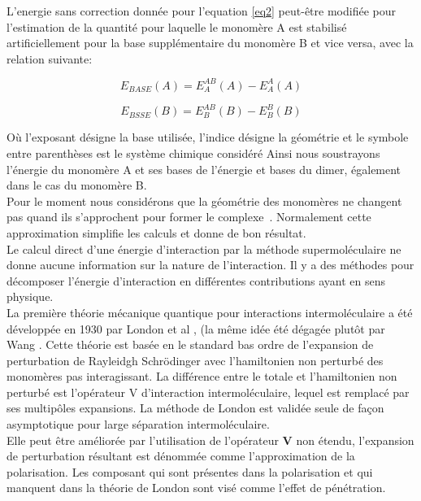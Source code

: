 L'energie sans correction donnée pour l'equation \ref{eq2}  peut-être modifiée pour l'estimation de la quantité pour laquelle le monomère A est stabilisé artificiellement pour la base supplémentaire du monomère B et vice versa, avec la relation suivante:

\begin{equation}
E_{BASE}(A) = E_{A}^{AB}(A) - E_{A}^{A}(A)
\end{equation}

\begin{equation}
E_{BSSE}(B) = E_{B}^{AB}(B) - E_{B}^{B}(B)
\end{equation}

Où l'exposant désigne la base utilisée, l'indice désigne la géométrie et le symbole entre parenthèses est le système chimique considéré Ainsi nous soustrayons l'énergie du monomère A et ses bases de l'énergie et bases du dimer, également dans le cas du monomère B.\\

Pour le moment nous considérons que la géométrie des monomères ne changent pas quand ils s'approchent pour former le complexe . Normalement cette approximation simplifie les calculs et donne de bon résultat.\\

Le calcul direct d’une énergie d’interaction par la méthode supermoléculaire ne donne aucune information sur la nature de l’interaction. Il y a des méthodes pour décomposer l’énergie d’interaction en différentes contributions ayant en sens physique.\\

La première théorie mécanique quantique pour interactions intermoléculaire a été développée en 1930 par London et al \cite{london1930z}, (la même idée été dégagée plutôt par Wang \cite{wang1927mutual}. Cette théorie est basée en le standard bas ordre de l’expansion  de perturbation de Rayleidgh Schrödinger avec l’hamiltonien non perturbé des monomères pas interagissant. La différence entre le totale et l’hamiltonien non perturbé est l’opérateur V d’interaction intermoléculaire, lequel est remplacé par ses multipôles expansions. La méthode de London est validée seule de façon asymptotique pour large séparation intermoléculaire.\\

Elle peut être améliorée par l’utilisation de l’opérateur \textbf{V} non étendu, l’expansion de perturbation résultant est  dénommée comme l’approximation de la polarisation. Les composant qui sont présentes dans la polarisation et qui manquent dans la théorie de London sont visé comme l’effet de pénétration.\\ 

